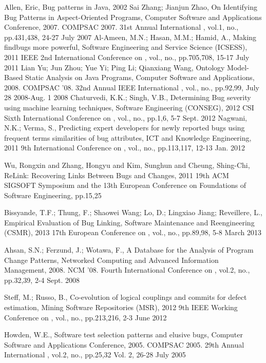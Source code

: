 \documentclass[conference]{IEEEtran}
\begin{document}
\begin{thebibliography}{1}
   Allen, Eric, Bug patterns in Java, 2002
   Sai Zhang; Jianjun Zhao, On Identifying Bug Patterns in Aspect-Oriented Programs, Computer Software and Applications Conference, 2007. COMPSAC 2007. 31st Annual International , vol.1, no., pp.431,438, 24-27 July 2007
   Al-Ameen, M.N.; Hasan, M.M.; Hamid, A., Making findbugs more powerful, Software Engineering and Service Science (ICSESS), 2011 IEEE 2nd International Conference on , vol., no., pp.705,708, 15-17 July 2011
   Lian Yu; Jun Zhou; Yue Yi; Ping Li; Qianxiang Wang, Ontology Model-Based Static Analysis on Java Programs, Computer Software and Applications, 2008. COMPSAC '08. 32nd Annual IEEE International , vol., no., pp.92,99, July 28 2008-Aug. 1 2008
   Chaturvedi, K.K.; Singh, V.B., Determining Bug severity using machine learning techniques, Software Engineering (CONSEG), 2012 CSI Sixth International Conference on , vol., no., pp.1,6, 5-7 Sept. 2012
   Nagwani, N.K.; Verma, S., Predicting expert developers for newly reported bugs using frequent terms similarities of bug attributes, ICT and Knowledge Engineering, 2011 9th International Conference on , vol., no., pp.113,117, 12-13 Jan. 2012

   Wu, Rongxin and Zhang, Hongyu and Kim, Sunghun and Cheung, Shing-Chi, ReLink: Recovering Links Between Bugs and Changes, 2011 19th ACM SIGSOFT Symposium and the 13th European Conference on Foundations of Software Engineering, pp.15,25

  Bissyande, T.F.; Thung, F.; Shaowei Wang; Lo, D.; Lingxiao Jiang; Reveillere, L., Empirical Evaluation of Bug Linking, Software Maintenance and Reengineering (CSMR), 2013 17th European Conference on , vol., no., pp.89,98, 5-8 March 2013


   Ahsan, S.N.; Ferzund, J.; Wotawa, F., A Database for the Analysis of Program Change Patterns, Networked Computing and Advanced Information Management, 2008. NCM '08. Fourth International Conference on , vol.2, no., pp.32,39, 2-4 Sept. 2008

  Steff, M.; Russo, B., Co-evolution of logical couplings and commits for defect estimation, Mining Software Repositories (MSR), 2012 9th IEEE Working Conference on , vol., no., pp.213,216, 2-3 June 2012


   Howden, W.E., Software test selection patterns and elusive bugs, Computer Software and Applications Conference, 2005. COMPSAC 2005. 29th Annual International , vol.2, no., pp.25,32 Vol. 2, 26-28 July 2005

\end{thebibliography}


\end{document}
